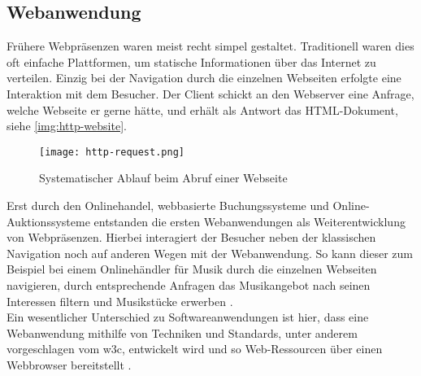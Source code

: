 \subsection{Webanwendung}
\label{sec:webanwendung}
Frühere Webpräsenzen waren meist recht simpel gestaltet. Traditionell waren dies oft einfache Plattformen, um statische Informationen über das Internet zu verteilen. Einzig bei der Navigation durch die einzelnen Webseiten erfolgte eine Interaktion mit dem Besucher. Der Client schickt an den Webserver eine Anfrage, welche Webseite er gerne hätte, und erhält als Antwort das HTML-Dokument, siehe \autoref{img:http-website}.

\begin{figure}[H]
	\begin{center}

		\texttt{[image: http-request.png]}
		\caption{Systematischer Ablauf beim Abruf einer Webseite}
		\label{img:http-website}
	\end{center}
\end{figure}

Erst durch den Onlinehandel, webbasierte Buchungssysteme und Online-Auktionssysteme entstanden die ersten Webanwendungen als Weiterentwicklung von Webpräsenzen. Hierbei interagiert der Besucher neben der klassischen Navigation noch auf anderen Wegen mit der Webanwendung. So kann dieser zum Beispiel bei einem Onlinehändler für Musik durch die einzelnen Webseiten navigieren, durch entsprechende Anfragen das Musikangebot nach seinen Interessen filtern und Musikstücke erwerben \cite[S. 89]{lid00}. \\
Ein wesentlicher Unterschied zu Softwareanwendungen ist hier, dass eine Webanwendung mithilfe von Techniken und Standards, unter anderem vorgeschlagen vom \ac{w3c}, entwickelt wird und so Web-Ressourcen über einen Webbrowser bereitstellt \cite[S. 2]{kap03}.



